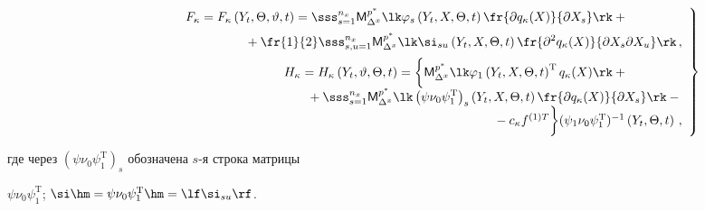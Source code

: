 \begin{equation}

\left.

\begin{array}{rl}

\hspace*{-10mm}F_\kappa = F_\kappa \left(Y_t,\Theta,\vartheta,t\right) =\displaystyle\sss_{s=1}^{n_x}

   {\sf M}_{\Delta^x}^{p^*} \lk \varphi_s \left(Y_t,X,\Theta,t\right)

   \fr{\partial q_\kappa (X)}{\partial X_s}\rk+{}\hspace*{15mm}\\[6pt]

\displaystyle\hspace*{40mm}{}+\fr{1}{2} \sss_{s,u=1}^{n_x}

     {\sf M}_{\Delta^x}^{p^*}\lk \si_{su} \left(Y_t,X,\Theta,t\right)

     \fr{\partial^2 q_\kappa (X)}{\partial X_s\partial X_u}\rk\,,

\\[6pt]

\hspace*{-10mm}H_\kappa = H_\kappa \left(Y_t,\vartheta,\Theta,t\right) =\biggl\{  {\sf M}_{\Delta^x}^{p^*}

   \lk \varphi_1 \left(Y_t,X,\Theta,t\right)^{\mathrm{T}} q_\kappa (X)\rk+{}\hspace*{15mm}\\

\displaystyle{}+ \sss_{s=1}^{n_x}

     {\sf M}_{\Delta^x}^{p^*}\lk \left(\psi\nu_0\psi_1^{\mathrm{T}}\right)_s 

     \left(Y_t,X,\Theta,t\right)

     \fr{\partial     q_\kappa (X)}{\partial X_s} \rk-{}\\

     {}- c_\kappa

    f^{(1)T} \biggr\} \pss^{-1} \left(Y_t,\Theta,t\right)\,,

    \end{array}

    \right\}

    \label{e4.11-s1}

    \end{equation}

где через $(\psi\nu_0\psi_1^{\mathrm{T}})_s$ обозначена  $s$-я строка матрицы

$\psi\nu_0\psi_1^{\mathrm{T}}$; $\si\hm=\psi\nu_0\psi_1^{\mathrm{T}} \hm=\lf \si_{su}\rf$.



